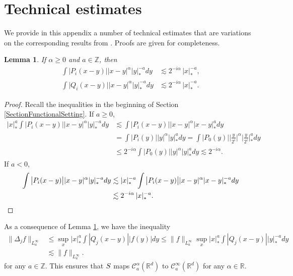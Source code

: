 \documentclass[11pt]{article}
\numberwithin{equation}{section}
\theoremstyle{plain}
\newtheorem{lem}[thm]{Lemma}
\theoremstyle{definition}
\newcommand{\bbR}{\mathbb{R}}
\newcommand{\bbZ}{\mathbb{Z}}
\newcommand{\mcC}{\mathcal{C}}
\begin{document}
\section{Technical estimates}
\label{SectionAppendix}

We provide in this appendix a number of technical estimates that are variations on the corresponding results from \cite{BH}. Proofs are given for completeness.

\begin{lem}\label{lem:weighted scaling}
If $\alpha\ge0$ and $a\in\bbZ$, then
\begin{align*}
\int \big|P_i(x-y)\big| |x-y|^\alpha|y|_*^{-a}dy&\lesssim2^{-i\alpha}\,|x|_*^{-a}, \\
\int \big|Q_i(x-y)\big| |x-y|^\alpha|y|_*^{-a}dy&\lesssim2^{-i\alpha}\,|x|_*^{-a}.
\end{align*}
\end{lem}

\begin{proof}
Recall the inequalities in the beginning of Section \ref{SectionFunctionalSetting}. If $a\ge0$,
\begin{align*}
|x|_*^a\int \big|P_i(x-y)\big| |x-y|^\alpha|y|_*^{-a}dy &\lesssim\int \big|P_i(x-y)\big| |x-y|^\alpha|x-y|_*^a dy\\
&= \int \big|P_i(y)\big| |y|^\alpha|y|_*^a dy = \int \big|P_0(y)\big| \Big|\frac{y}{2^i}\Big|^\alpha\Big|\frac{y}{2^i}\Big|_*^ady\\
&\le 2^{-i\alpha}\int \big|P_0(y)\big| |y|^\alpha |y|_*^ady\lesssim2^{-i\alpha}.
\end{align*}
If $a<0$,
\begin{align*}
\int \big|P_i(x-y)\big| |x-y|^\alpha |y|_*^{-a}dy &\lesssim|x|_*^{-a}\int \big|P_i(x-y)\big| |x-y|^\alpha|x-y|_*^{-a}dy\\
&\lesssim 2^{-i\alpha}\,|x|_*^{-a}.\qedhere
\end{align*}
\end{proof}

As a consequence of Lemma \ref{lem:weighted scaling}, we have the inequality
\begin{align*}
\|\Delta_jf\|_{L_a^\infty}
&\le\sup_x |x|_*^a\int|Q_j(x-y)||f(y)|dy
\le\|f\|_{L_a^\infty}\sup_x |x|_*^a\int|Q_j(x-y)||y|_*^{-a}dy\\
&\lesssim\|f\|_{L_a^\infty}.
\end{align*}
for any $a\in\bbZ$. This ensures that $\textsc{S}$ maps $\mcC_a^\alpha(\bbR^d)$ to $\mcC_a^\infty(\bbR^d)$ for any $\alpha\in\bbR$.
\end{document}
